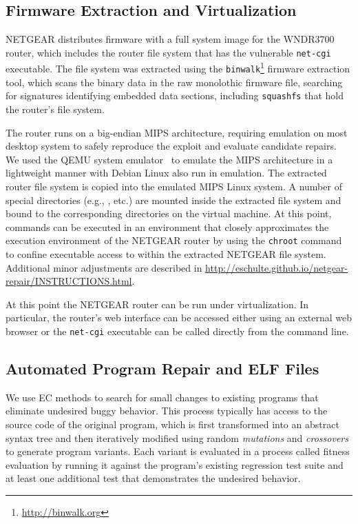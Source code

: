 \documentclass{sigcomm-alternate}
\begin{document}
\subsection{Firmware Extraction and Virtualization}
\label{sec-3-1}
NETGEAR distributes firmware with a full system image for the
WNDR3700 router, which includes the router file system that has the
vulnerable \texttt{net-cgi} executable. 
The file system was extracted using the 
\texttt{binwalk}\footnote{\url{http://binwalk.org}} firmware extraction
tool, which scans the binary data in the raw monolothic firmware file,
searching for signatures
identifying embedded data sections,
including {\tt squashfs}\cite{lougher2006squashfs} that
hold the router's file system.

The router runs on a big-endian MIPS architecture, requiring emulation
on most desktop system to safely reproduce the exploit and evaluate
candidate repairs. We used the QEMU system
emulator~\cite{bellard2005qemu} to emulate the MIPS architecture in a
lightweight manner with Debian Linux also run in
emulation.  The extracted router file system is copied into the
emulated MIPS Linux system.  A number of special directories (e.g.,
,  etc.) are mounted inside the extracted
file system and bound to the corresponding directories on the virtual
machine.  At this point, commands can be executed in an environment
that closely approximates the execution environment of the NETGEAR
router by using the \texttt{chroot} command to confine executable access
to within the extracted NETGEAR file system. Additional minor
adjustments are described in \url{http://eschulte.github.io/netgear-repair/INSTRUCTIONS.html}.

At this point the NETGEAR router can be run under virtualization.  In
particular, the router's web interface can be accessed either using an
external web browser or the \texttt{net-cgi} executable can be called
directly from the command line.

\subsection{Automated Program Repair and ELF Files}
\label{sec-3-2}

We use EC methods
\cite{forrest2009genetic,genprog-tse-journal,le2012representations,legoues2011systematicstudy}
to search for small changes to existing programs that eliminate
undesired buggy behavior.  This process typically has access to the
source code of the original program, which is first transformed into
an abstract syntax tree and then iteratively modified using random
\emph{mutations} and \emph{crossovers} to generate program variants.
Each variant is evaluated in a process called fitness evaluation by
running it against the program's existing regression test suite and at
least one additional test that demonstrates the undesired behavior.
\end{document}

